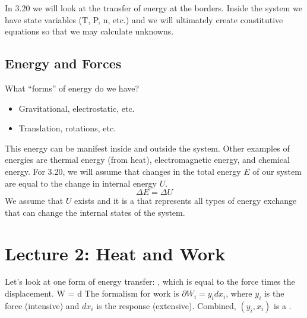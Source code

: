 \documentclass[12pt]{article}
\begin{document}
In 3.20 we will look at the transfer of energy at the borders.  Inside the system we have state variables (T, P, n, etc.) and we will ultimately create constitutive equations so that we may calculate unknowns.

\subsection{Energy and Forces}
What ``forms'' of energy do we have?
\begin{itemize}
\item {} Gravitational, electrostatic, etc.
\item {} Translation, rotations, etc.  
\end{itemize}
This energy can be manifest inside and outside the system.  Other examples of energies are thermal energy (from heat), electromagnetic energy, and chemical energy.
For 3.20, we will assume that changes in the total energy $E$ of our system are equal to the change in internal energy $U$.
\begin{equation}
\Delta E = \Delta U
\end{equation}
We assume that $U$ exists and it is a  that represents all types of energy exchange that can change the internal states of the system.

\section{Lecture 2: Heat and Work}
Let's look at one form of energy transfer: , which is equal to the force times the displacement.
\eqs
W =  \cdot d
\eqe
The formalism for work is $\partial W_i = y_i dx_i$, where $y_i$ is the force (intensive) and $dx_i$ is the response (extensive).  Combined, $(y_i, x_i)$ is a .
\end{document}

